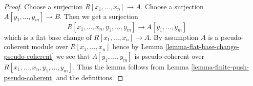 \documentclass[10pt,a4paper]{amsart}
\theoremstyle{plain}
\theoremstyle{definition}
\theoremstyle{remark}
\numberwithin{equation}{subsection}
\begin{document}
\begin{proof}
Choose a surjection $R[x_1, \ldots, x_n] \to A$.
Choose a surjection $A[y_1, \ldots, y_m] \to B$.
Then we get a surjection
$$
R[x_1, \ldots, x_n, y_1, \ldots, y_m] \to A[y_1, \ldots, y_m]
$$
which is a flat base change of $R[x_1, \ldots, x_n] \to A$.
By assumption $A$ is a pseudo-coherent module over $R[x_1, \ldots, x_n]$
hence by
Lemma \ref{lemma-flat-base-change-pseudo-coherent}
we see that $A[y_1, \ldots, y_m]$ is pseudo-coherent over
$R[x_1, \ldots, x_n, y_1, \ldots, y_m]$. Thus the lemma follows from
Lemma \ref{lemma-finite-push-pseudo-coherent}
and the definitions.
\end{proof}
\end{document}

